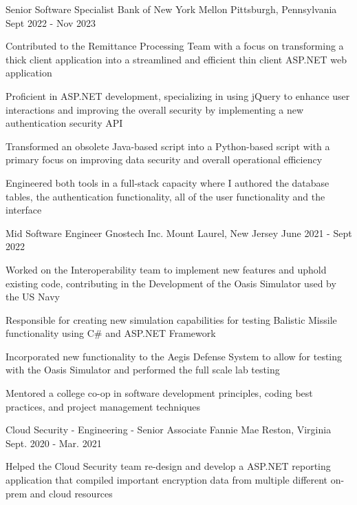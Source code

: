 \begin{cventries}
  \cventry
    {Senior Software Specialist}
    {Bank of New York Mellon}
    {Pittsburgh, Pennsylvania}
    {Sept 2022 - Nov 2023}
    {
      \begin{cvitems}
        \item {Contributed to the Remittance Processing Team with a focus on transforming a thick client application into a streamlined and efficient thin client ASP.NET web application}
        \item {Proficient in ASP.NET development, specializing in using jQuery to enhance user interactions and improving the overall security by implementing a new authentication security API}
        \item {Transformed an obsolete Java-based script into a Python-based script with a primary focus on improving data security and overall operational efficiency}
        \item {Engineered both tools in a full-stack capacity where I authored the database tables, the authentication functionality, all of the user functionality and the interface}
      \end{cvitems}
    }
  \cventry
    {Mid Software Engineer}
    {Gnostech Inc.}
    {Mount Laurel, New Jersey}
    {June 2021 - Sept 2022}
    {
      \begin{cvitems}
        \item {Worked on the Interoperability team to implement new features and uphold existing code, contributing in the Development of the Oasis Simulator used by the US Navy}
        \item {Responsible for creating new simulation capabilities for testing Balistic Missile functionality using C\# and ASP.NET Framework}
        \item {Incorporated new functionality to the Aegis Defense System to allow for testing with the Oasis Simulator and performed the full scale lab testing}
        \item {Mentored a college co-op in software development principles, coding best practices, and project management techniques}
      \end{cvitems}
    }
  \cventry
    {Cloud Security - Engineering - Senior Associate}
    {Fannie Mae}
    {Reston, Virginia}
    {Sept. 2020 - Mar. 2021}
    {
      \begin{cvitems}
        \item {Helped the Cloud Security team re-design and develop a ASP.NET reporting application that compiled important encryption data from multiple different on-prem and cloud resources}

\end{cvitems}}
\end{cventries}
